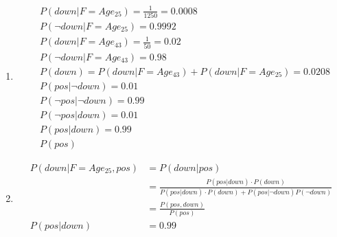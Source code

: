\documentclass[fleqn,12pt]{scrartcl}
\begin{document}
\begin{enumerate}
	\item
\begin{align*}
	&P(down | F=Age_{25}) = \frac1{1250} = 0.0008\\
	&P(\neg down | F=Age_{25}) = 0.9992\\
	&P(down | F=Age_{43}) = \frac1{50} = 0.02\\
	&P(\neg down | F=Age_{43}) = 0.98\\
	&P(down) = P(down | F=Age_{43}) + P(down | F=Age_{25}) = 0.0208 \\
	&P(pos | \neg down) = 0.01\\
	&P(\neg pos | \neg down) = 0.99\\
	&P(\neg pos | down) = 0.01\\
	&P(pos | down) = 0.99\\
	&P(pos)
\end{align*}
\item
	\begin{align*}
		P(down | F=Age_{25}, pos) &= P(down | pos) \\
																&= \frac{P(pos|down)\cdot P(down)}{P(pos|down)\cdot P(down) + P(pos| \neg down) P(\neg down)}\\
																											 &= \frac{P(pos, down)}{P(pos)}\\
		P(pos|down) &= 0.99\\
	\end{align*}

\end{enumerate}
\end{document}

